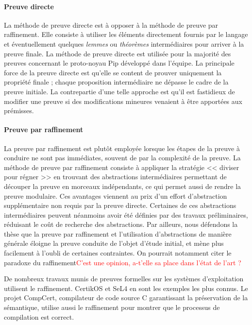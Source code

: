 			\paragraph{Preuve directe} La méthode de preuve directe est à opposer à la méthode de preuve par raffinement. Elle consiste à utiliser les éléments directement fournis par le langage et éventuellement quelques \emph{lemmes} ou \emph{théorèmes} intermédiaires pour arriver à la preuve finale. La méthode de preuve directe est utilisée pour la majorité des preuves concernant le proto-noyau Pip développé dans l'équipe. La principale force de la preuve directe est qu'elle se content de prouver uniquement la propriété finale ; chaque proposition intermédiaire ne dépasse le cadre de la preuve initiale. La contrepartie d'une telle approche est qu'il est fastidieux de modifier une preuve si des modifications mineures venaient à être apportées aux prémisses.
			
			\paragraph{Preuve par raffinement} La preuve par raffinement est plutôt employée lorsque les étapes de la preuve à conduire ne sont pas immédiates, souvent de par la complexité de la preuve. La méthode de preuve par raffinement consiste à appliquer la stratégie << diviser pour régner >> en trouvant des abstractions intermédiaires permettant de découper la preuve en morceaux indépendants, ce qui permet aussi de rendre la preuve modulaire. Ces avantages viennent au prix d'un effort d'abstraction supplémentaire non requis par la preuve directe. Certaines de ces abstractions intermédiaires peuvent néanmoins avoir été définies par des travaux préliminaires, réduisant le coût de recherche des abstractions. Par ailleurs, nous défendons la thèse que la preuve par raffinement et l'utilisation d'abstractions de manière générale éloigne la preuve conduite de l'objet d'étude initial, et mène plus facilement à l'oubli de certaines contraintes. On pourrait notamment citer le paradoxe du raffinement\textcolor{red}{C'est une opinion, a-t'elle sa place dans l'état de l'art ?}

			De nombreux travaux munis de preuves formelles sur les systèmes d'exploitation utilisent le raffinement. CertikOS et SeL4 en sont les exemples les plus connus. Le projet CompCert, compilateur de code source C garantissant la préservation de la sémantique, utilise aussi le raffinement pour montrer que le processus de compilation est correct.

